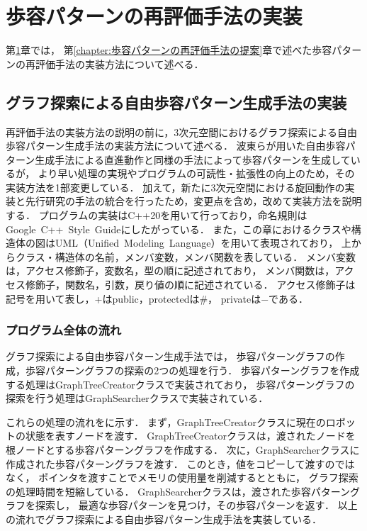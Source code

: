 ﻿%

\chapter{歩容パターンの再評価手法の実装}\label{chapter:歩容パターンの再評価手法の実装}
第\ref{chapter:歩容パターンの再評価手法の実装}章では，
第\ref{chapter:歩容パターンの再評価手法の提案}章で述べた歩容パターンの再評価手法の実装方法について述べる．

\section{グラフ探索による自由歩容パターン生成手法の実装}
再評価手法の実装方法の説明の前に，3次元空間におけるグラフ探索による自由歩容パターン生成手法の実装方法について述べる．
波東らが用いた自由歩容パターン生成手法による直進動作と同様の手法によって歩容パターンを生成しているが，
より早い処理の実現やプログラムの可読性・拡張性の向上のため，その実装方法を1部変更している．
加えて，新たに3次元空間における旋回動作の実装と先行研究の手法の統合を行ったため，変更点を含め，改めて実装方法を説明する．
プログラムの実装はC++20を用いて行っており，命名規則はGoogle~C++~Style~Guide\cite{cita:google_cpp_style_guide}にしたがっている．
また，この章におけるクラスや構造体の図はUML（Unified~Modeling~Language）を用いて表現されており，
上からクラス・構造体の名前，メンバ変数，メンバ関数を表している．
メンバ変数は，アクセス修飾子，変数名，型の順に記述されており，
メンバ関数は，アクセス修飾子，関数名，引数，戻り値の順に記述されている．
アクセス修飾子は記号を用いて表し，+はpublic，protectedは\#，
privateは$-$である．

\subsection{プログラム全体の流れ}
グラフ探索による自由歩容パターン生成手法では，
歩容パターングラフの作成，歩容パターングラフの探索の2つの処理を行う．
歩容パターングラフを作成する処理はGraphTreeCreatorクラスで実装されており，
歩容パターングラフの探索を行う処理はGraphSearcherクラスで実装されている．

これらの処理の流れをに示す．
まず，GraphTreeCreatorクラスに現在のロボットの状態を表すノードを渡す．
GraphTreeCreatorクラスは，渡されたノードを根ノードとする歩容パターングラフを作成する．
次に，GraphSearcherクラスに作成された歩容パターングラフを渡す．
このとき，値をコピーして渡すのではなく，
ポインタを渡すことでメモリの使用量を削減するとともに，
グラフ探索の処理時間を短縮している．
GraphSearcherクラスは，渡された歩容パターングラフを探索し，
最適な歩容パターンを見つけ，その歩容パターンを返す．
以上の流れでグラフ探索による自由歩容パターン生成手法を実装している．

